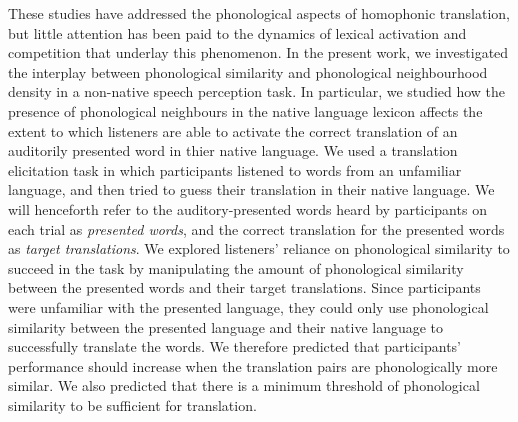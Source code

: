 \documentclass[
]{article}
\begin{document}
These studies have addressed the phonological aspects of homophonic
translation, but little attention has been paid to the dynamics of
lexical activation and competition that underlay this phenomenon. In the
present work, we investigated the interplay between phonological
similarity and phonological neighbourhood density in a non-native speech
perception task. In particular, we studied how the presence of
phonological neighbours in the native language lexicon affects the
extent to which listeners are able to activate the correct translation
of an auditorily presented word in thier native language. We used a
translation elicitation task in which participants listened to words
from an unfamiliar language, and then tried to guess their translation
in their native language. We will henceforth refer to the
auditory-presented words heard by participants on each trial as
\emph{presented words}, and the correct translation for the presented
words as \emph{target translations}. We explored listeners' reliance on
phonological similarity to succeed in the task by manipulating the
amount of phonological similarity between the presented words and their
target translations. Since participants were unfamiliar with the
presented language, they could only use phonological similarity between
the presented language and their native language to successfully
translate the words. We therefore predicted that participants'
performance should increase when the translation pairs are
phonologically more similar. We also predicted that there is a minimum
threshold of phonological similarity to be sufficient for translation.
\end{document}
